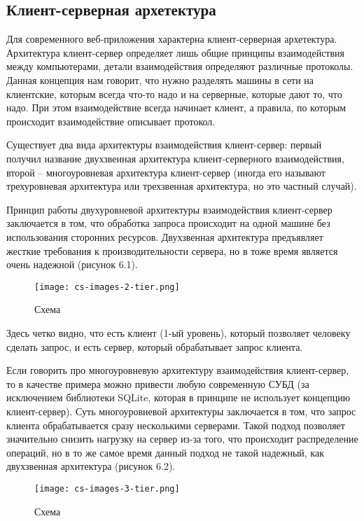 \subsection{Клиент-серверная архетектура}

Для современного веб-приложения характерна клиент-серверная архетектура. Архитектура клиент-сервер определяет лишь общие принципы взаимодействия между компьютерами, детали взаимодействия определяют различные протоколы. Данная концепция нам говорит, что нужно разделять машины в сети на клиентские, которым всегда что-то надо и на серверные, которые дают то, что надо. При этом взаимодействие всегда начинает клиент, а правила, по которым происходит взаимодействие описывает протокол.

Существует два вида архитектуры взаимодействия клиент-сервер: первый получил название двухзвенная архитектура клиент-серверного взаимодействия, второй – многоуровневая архитектура клиент-сервер (иногда его называют трехуровневая архитектура или трехзвенная архитектура, но это частный случай).

Принцип работы двухуровневой архитектуры взаимодействия клиент-сервер заключается в том, что обработка запроса происходит на одной машине без использования сторонних ресурсов. Двухзвенная архитектура предъявляет жесткие требования к производительности сервера, но в тоже время является очень надежной (рисунок 6.1).

\begin{figure}[h!]
\centering
	\texttt{[image: cs-images-2-tier.png]}
	\caption{Схема}
	\clearpage
\end{figure}

Здесь четко видно, что есть клиент (1-ый уровень), который позволяет человеку сделать запрос, и есть сервер, который обрабатывает запрос клиента.

Если говорить про многоуровневую архитектуру взаимодействия клиент-сервер, то в качестве примера можно привести любую современную СУБД (за исключением библиотеки SQLite, которая в принципе не использует концепцию клиент-сервер).  Суть многоуровневой архитектуры заключается в том, что запрос клиента обрабатывается сразу несколькими серверами. Такой подход позволяет значительно снизить нагрузку на сервер из-за того, что происходит распределение операций, но в то же самое время данный подход не такой надежный, как двухзвенная архитектура (рисунок 6.2).

\begin{figure}[h!]
\centering
	\texttt{[image: cs-images-3-tier.png]}
	\caption{Схема}
	\clearpage
\end{figure}

